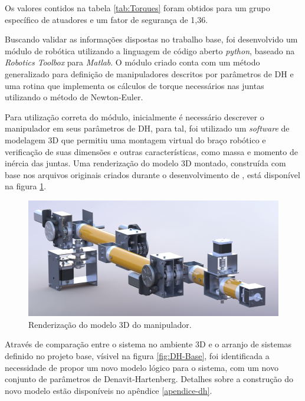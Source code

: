 Os valores contidos na tabela \ref{tab:Torques} foram obtidos para um 
grupo específico de atuadores e um fator de segurança de 1,36.

Buscando validar as informações dispostas no trabalho base, foi desenvolvido 
um módulo de robótica utilizando a linguagem de código aberto \textit{python},
baseado na \textit{Robotics Toolbox} para \textit{Matlab}. O módulo criado 
conta com um método generalizado para definição de manipuladores descritos por
parâmetros de DH e uma rotina que implementa os cálculos de torque necessários
nas juntas utilizando o método de Newton-Euler.

Para utilização correta do módulo, inicialmente é necessário descrever o 
manipulador em seus parâmetros de DH, para tal, foi utilizado um \textit{software}
de modelagem 3D que permitiu uma montagem virtual do braço robótico e 
verificação de suas dimensões e outras características, como massa e momento 
de inércia das juntas. Uma renderização do modelo 3D montado, construída 
com base nos arquivos originais criados durante o 
desenvolvimento de \cite{fernando2019assistivo}, está disponível
na figura \ref{fig:manipulador-render}.

\begin{figure}[htb]
    \caption{Renderização do modelo 3D do manipulador.}    
    \begin{centering}

        \includegraphics[width=0.8\columnwidth]{images/arm/render.jpg}
    
    \par\end{centering}

    \label{fig:manipulador-render}
\end{figure}

Através de comparação entre o sistema no ambiente 3D e o arranjo de sistemas definido no projeto base,
vísivel na figura \ref{fig:DH-Base}, foi identificada a necessidade de propor um novo modelo
lógico para o sistema, com um novo conjunto de parâmetros de Denavit-Hartenberg.
Detalhes sobre a construção do novo modelo estão disponíveis no apêndice \ref{apendice-dh}.

